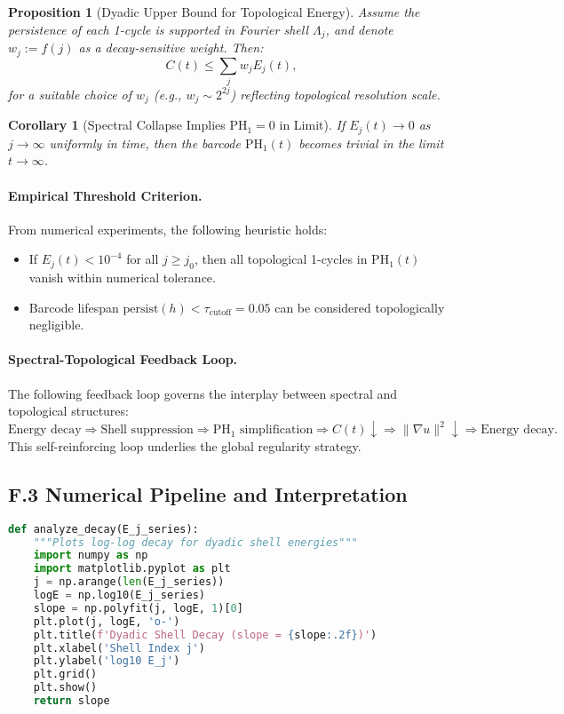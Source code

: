 \documentclass[11pt]{article}
\newtheorem{proposition}[theorem]{Proposition}
\newtheorem{corollary}[theorem]{Corollary}
\theoremstyle{definition}
\begin{document}
\begin{proposition}[Dyadic Upper Bound for Topological Energy]
Assume the persistence of each 1-cycle is supported in Fourier shell \( \Lambda_j \), and denote
\( w_j := f(j) \) as a decay-sensitive weight. Then:
\[ 
C(t) \leq \sum_j w_j E_j(t),
\]
for a suitable choice of \( w_j \) (e.g., \( w_j \sim 2^{2j} \)) reflecting topological resolution scale.
\end{proposition}

\begin{corollary}[Spectral Collapse Implies \( \mathrm{PH}_1 = 0 \) in Limit]
If \( E_j(t) \to 0 \) as \( j \to \infty \) uniformly in time, then the barcode \( \mathrm{PH}_1(t) \) becomes trivial in the limit
\( t \to \infty \).
\end{corollary}

\paragraph{Empirical Threshold Criterion.} From numerical experiments, the following heuristic holds:
\begin{itemize}
  \item If \( E_j(t) < 10^{-4} \) for all \( j \geq j_0 \), then all topological 1-cycles in \( \mathrm{PH}_1(t) \) vanish within numerical tolerance.
  \item Barcode lifespan \( \text{persist}(h) < \tau_{\text{cutoff}} = 0.05 \) can be considered topologically negligible.
\end{itemize}

\paragraph{Spectral-Topological Feedback Loop.} The following feedback loop governs the interplay between spectral and topological structures:
\[ 
\text{Energy decay} \Rightarrow \text{Shell suppression} \Rightarrow \mathrm{PH}_1 \text{ simplification} \Rightarrow C(t) \downarrow \Rightarrow \|\nabla u\|^2 \downarrow \Rightarrow \text{Energy decay}.
\]
This self-reinforcing loop underlies the global regularity strategy.

\subsection*{F.3 Numerical Pipeline and Interpretation}

\begin{lstlisting}[language=Python]
def analyze_decay(E_j_series):
    """Plots log-log decay for dyadic shell energies"""
    import numpy as np
    import matplotlib.pyplot as plt
    j = np.arange(len(E_j_series))
    logE = np.log10(E_j_series)
    slope = np.polyfit(j, logE, 1)[0]
    plt.plot(j, logE, 'o-')
    plt.title(f'Dyadic Shell Decay (slope = {slope:.2f})')
    plt.xlabel('Shell Index j')
    plt.ylabel('log10 E_j')
    plt.grid()
    plt.show()
    return slope
\end{lstlisting}
\end{document}
